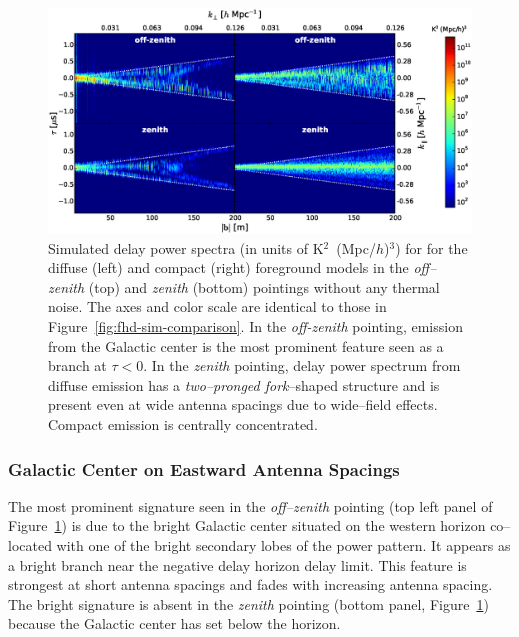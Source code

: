 \documentclass[preprint2,iop,numberedappendix,twocolappendix,appendixfloats]{emulateapj}
\begin{document}
\begin{figure}[htb]
\centering
\includegraphics[width=\linewidth]{figure7.eps}
\caption{Simulated delay power spectra (in units of K$^2$~(Mpc/$h$)$^3$) for for the diffuse (left) and compact (right) foreground models in the {\it off--zenith} (top) and {\it zenith} (bottom) pointings without any thermal noise. The axes and color scale are identical to those in Figure~\ref{fig:fhd-sim-comparison}. In the {\it off-zenith} pointing, emission from the Galactic center is the most prominent feature seen as a branch at $\tau<0$. In the {\it zenith} pointing, delay power spectrum from diffuse emission has a {\it two--pronged fork}--shaped structure and is present even at wide antenna spacings due to wide--field effects. Compact emission is centrally concentrated. \label{fig:noiseless-dsm-csm-delay-spectrum}}
\end{figure}

\subsubsection{Galactic Center on Eastward Antenna Spacings}\label{sec:GC-east}

The most prominent signature seen in the {\it off--zenith} pointing (top left panel of Figure~\ref{fig:noiseless-dsm-csm-delay-spectrum}) is due to the bright Galactic center situated on the western horizon co--located with one of the bright secondary lobes of the power pattern. It appears as a bright branch near the negative delay horizon delay limit. This feature is strongest at short antenna spacings and fades with increasing antenna spacing. The bright signature is absent in the {\it zenith} pointing (bottom panel, Figure~\ref{fig:noiseless-dsm-csm-delay-spectrum}) because the Galactic center has set below the horizon. 
\end{document}
